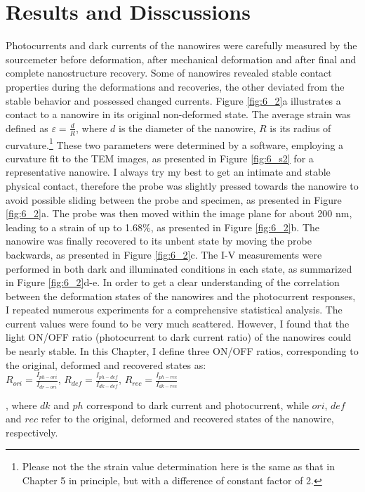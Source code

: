 \section{Results and Disscussions}
Photocurrents and dark currents of the nanowires were carefully measured by the sourcemeter before deformation, after mechanical deformation and after final and complete nanostructure recovery. 
Some of nanowires revealed stable contact properties during the deformations and recoveries, the other deviated from the stable behavior and possessed changed currents. 
Figure \ref{fig:6_2}a illustrates a contact to a nanowire in its original non-deformed state. 
The average strain was defined as $\varepsilon = \frac{d}{R}$, where $d$ is the diameter of the nanowire, $R$ is its radius of  curvature.\footnote{Please not the the strain value determination here is the same as that in Chapter 5 in principle, but with a difference of constant factor of 2.} 
These two parameters were determined by a software, employing a curvature fit to the TEM images, as presented in Figure \ref{fig:6_s2} for a representative nanowire. 
I always try my best to get an intimate and stable physical contact, therefore the probe was slightly pressed towards the nanowire to avoid possible sliding between the probe and specimen, as presented in Figure \ref{fig:6_2}a. 
The probe was then moved within the image plane for about 200 nm, leading to a strain of up to 1.68\%, as presented in Figure \ref{fig:6_2}b. 
The nanowire was finally recovered to its unbent state by moving the probe backwards, as presented in Figure \ref{fig:6_2}c. 
The I-V measurements were performed in both dark and illuminated conditions in each state, as summarized in Figure \ref{fig:6_2}d-e. 
In order to get a clear understanding of the correlation between the deformation states of the nanowires and the photocurrent responses, I repeated numerous experiments for a comprehensive statistical analysis. 
The current values were found to be very much scattered. 
However, I found that the light ON/OFF ratio (photocurrent to dark current ratio) of the nanowires could be nearly stable. 
In this Chapter, I define three ON/OFF ratios, corresponding to the original, deformed and recovered states as:\\
{\center
$R_{ori} = \frac{I_{ph-ori}}{I_{dr-ori}}$, $R_{def} = \frac{I_{ph-def}}{I_{dk-def}}$, $R_{rec} = \frac{I_{ph-rec}}{I_{dk-rec}}$\\}

, where $dk$ and $ph$ correspond to dark current and photocurrent, while $ori$, $def$ and $rec$ refer to the original, deformed and recovered states of the nanowire, respectively.\\


